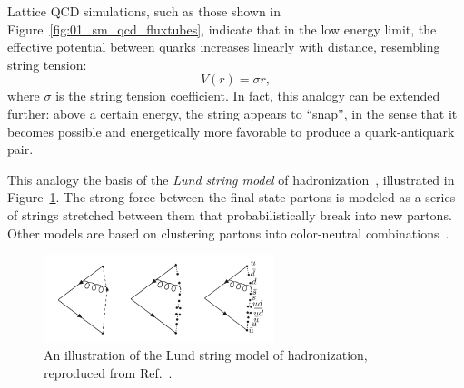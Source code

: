 Lattice QCD simulations, such as those shown in Figure~\ref{fig:01_sm_qcd_fluxtubes}, indicate that in the low energy limit, the effective potential between quarks increases linearly with distance, resembling string tension:
\begin{equation}
	\label{eq:01_sm_qcd_string}
	V(r) = \sigma r,
\end{equation}
where $\sigma$ is the string tension coefficient.
In fact, this analogy can be extended further: above a certain energy, the string appears to ``snap'', in the sense that it becomes possible and energetically more favorable to produce a quark-antiquark pair.

This analogy the basis of the \textit{Lund string model} of hadronization~\cite{Andersson:1983ia}, illustrated in Figure~\ref{fig:01_sm_qcd_lundstring}.
The strong force between the final state partons is modeled as a series of strings stretched between them that probabilistically break into new partons.
Other models are based on clustering partons into color-neutral combinations~\cite{Corcella:2000bw}.

\begin{figure}[ht]
	\centering
	\includegraphics[width=0.6\textwidth]{figures/01-SM-03-SM/qcd/Lund_string.png}
	\caption{An illustration of the Lund string model of hadronization, reproduced from Ref.~\cite{Prestel:2018Lecture}.}
	\label{fig:01_sm_qcd_lundstring}
\end{figure}







